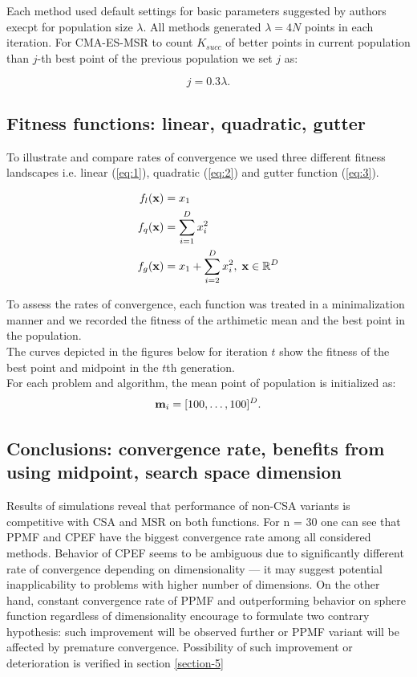 \documentclass[runningheads,a4paper]{llncs}
\newcommand{\wek}[1]{
    {\bf #1} 
}
\begin{document}
Each method used default settings for basic parameters suggested by authors execpt for 
population size $\lambda$. All methods generated $\lambda = 4N$ points in each iteration.
For CMA-ES-MSR to count $K_{succ}$ of better points in current population than $j$-th best point 
of the previous population we set $j$ as:

\begin{equation*}
j = 0.3\lambda.
\end{equation*}

\subsection{Fitness functions: linear, quadratic, gutter}

To illustrate and compare rates of convergence we used three different fitness landscapes i.e. linear (\ref{eq:1}), quadratic
(\ref{eq:2}) and gutter function (\ref{eq:3}).

\begin{align}
  f_{l}(\wek{x}) &= x_{1}  \label{eq:1} \\
  f_{q}(\wek{x}) &= \sum^{D}_{i = 1} x^{2}_{i} \label{eq:2} \\
  f_{g}(\wek{x}) &= x_{1} + \sum^{D}_{i = 2} x^{2}_{i}, \; \wek{x} \in \mathbb{R}^{D}  \label{eq:3}
\end{align}

To assess the rates of convergence, each function was treated in a minimalization manner and we recorded the fitness of the 
arthimetic mean and the best point in the population. \\
The curves depicted in the figures below for iteration $t$ show the fitness of the best point and midpoint in the $t$th generation. \\ 
For each problem and algorithm, the mean point of population is initialized as:
\begin{equation*}
  \wek{m}_{i} = [100, \dots, 100]^{D}.
\end{equation*}

\subsection{Conclusions: convergence rate, benefits from using midpoint, search space dimension}
Results of simulations reveal that performance of non-CSA variants is competitive with CSA and MSR on both functions.
For n = 30 one can see that PPMF and CPEF have the biggest convergence rate among all considered methods.
Behavior of CPEF seems to be ambiguous due to significantly different rate of convergence depending on dimensionality — it may suggest potential inapplicability to problems with higher number of dimensions.
On the other hand, constant convergence rate of PPMF and outperforming behavior on sphere function regardless of dimensionality  encourage to formulate two contrary hypothesis: such improvement will be observed further or PPMF variant will be affected by premature convergence.
Possibility of such improvement or deterioration is verified in section \ref{section-5}
\end{document}
